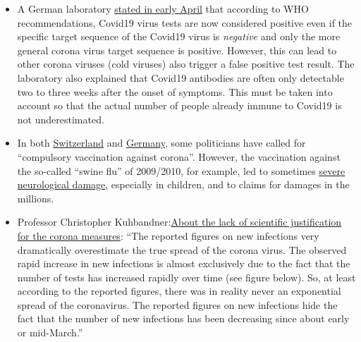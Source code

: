 \begin{itemize}
{  to no scientific evidence''} for the effectiveness of measures such as
  ``social distancing'', travel restrictions and lockdowns.
  (\href{https://www.who.int/influenza/publications/public_health_measures/publication/en/}{Original
  study})
\item
  A German laboratory
  \href{http://www.labor-augsburg-mvz.de/de/aktuelles/coronavirus}{stated
  in early April} that according to WHO recommendations, Covid19 virus
  tests are now considered positive even if the specific target sequence
  of the Covid19 virus is \emph{negative} and only the more general
  corona virus target sequence is positive. However, this can lead to
  other corona viruses (cold viruses) also trigger a false positive test
  result. The laboratory also explained that Covid19 antibodies are
  often only detectable two to three weeks after the onset of symptoms.
  This must be taken into account so that the actual number of people
  already immune to Covid19 is not underestimated.
\item
  In both
  \href{https://www.20min.ch/schweiz/news/story/-rzte-und-Politiker-fordern-Corona-Impfzwang-20853917}{Switzerland}
  and
  \href{https://www.t-online.de/nachrichten/deutschland/id_87757340/corona-krise-markus-soeder-spricht-sich-fuer-deutschlandweite-impfpflicht-aus.html}{Germany},
  some politicians have called for ``compulsory vaccination against
  corona''. However, the vaccination against the so-called ``swine flu''
  of 2009/2010, for example, led to sometimes
  \href{https://www.ibtimes.co.uk/brain-damaged-uk-victims-swine-flu-vaccine-get-60-million-compensation-1438572}{severe
  neurological damage}, especially in children, and to claims for
  damages in the millions.
\item
  Professor Christopher
  Kuhbandner:\href{https://www.heise.de/tp/features/Von-der-fehlenden-wissenschaftlichen-Begruendung-der-Corona-Massnahmen-4709563.html?seite=all}{About
  the lack of scientific justification for the corona measures}: ``The
  reported figures on new infections very dramatically overestimate the
  true spread of the corona virus. The observed rapid increase in new
  infections is almost exclusively due to the fact that the number of
  tests has increased rapidly over time (see figure below). So, at least
  according to the reported figures, there was in reality never an
  exponential spread of the coronavirus. The reported figures on new
  infections hide the fact that the number of new infections has been
  decreasing since about early or mid-March.''
\end{itemize}

